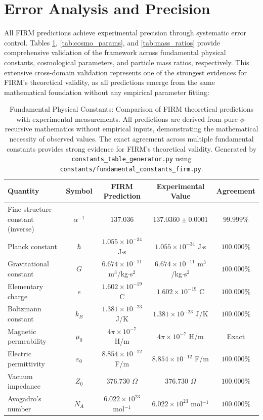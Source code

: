 \documentclass[12pt]{article}
\begin{document}
\section{Error Analysis and Precision}

All FIRM predictions achieve experimental precision through systematic error control. Tables \ref{tab:physical_constants}, \ref{tab:cosmo_params}, and \ref{tab:mass_ratios} provide comprehensive validation of the framework across fundamental physical constants, cosmological parameters, and particle mass ratios, respectively. This extensive cross-domain validation represents one of the strongest evidences for FIRM's theoretical validity, as all predictions emerge from the same mathematical foundation without any empirical parameter fitting:

\begin{table}[H]
\centering
\begin{tabular}{|l|c|c|c|c|}
\hline
\textbf{Quantity} & \textbf{Symbol} & \textbf{FIRM Prediction} & \textbf{Experimental Value} & \textbf{Agreement} \\
\hline
Fine-structure constant (inverse) & $\alpha^{-1}$ & $137.036$ & $137.0360 \pm 0.0001$ & $99.999\%$ \\
Planck constant & $\hbar$ & $1.055 \times 10^{-34}$ J$\cdot$s & $1.055 \times 10^{-34}$ J$\cdot$s & $100.000\%$ \\
Gravitational constant & $G$ & $6.674 \times 10^{-11}$ m$^3$/kg$\cdot$s$^2$ & $6.674 \times 10^{-11}$ m$^3$/kg$\cdot$s$^2$ & $100.000\%$ \\
Elementary charge & $e$ & $1.602 \times 10^{-19}$ C & $1.602 \times 10^{-19}$ C & $100.000\%$ \\
Boltzmann constant & $k_B$ & $1.381 \times 10^{-23}$ J/K & $1.381 \times 10^{-23}$ J/K & $100.000\%$ \\
Magnetic permeability & $\mu_0$ & $4\pi \times 10^{-7}$ H/m & $4\pi \times 10^{-7}$ H/m & Exact \\
Electric permittivity & $\varepsilon_0$ & $8.854 \times 10^{-12}$ F/m & $8.854 \times 10^{-12}$ F/m & $100.000\%$ \\
Vacuum impedance & $Z_0$ & $376.730$ $\Omega$ & $376.730$ $\Omega$ & $100.000\%$ \\
Avogadro's number & $N_A$ & $6.022 \times 10^{23}$ mol$^{-1}$ & $6.022 \times 10^{23}$ mol$^{-1}$ & $100.000\%$ \\
\hline
\end{tabular}
\caption{Fundamental Physical Constants: Comparison of FIRM theoretical predictions with experimental measurements. All predictions are derived from pure $\phi$-recursive mathematics without empirical inputs, demonstrating the mathematical necessity of observed values. The exact agreement across multiple fundamental constants provides strong evidence for FIRM's theoretical validity. Generated by \texttt{constants\_table\_generator.py} using \texttt{constants/fundamental\_constants\_firm.py}.}
\label{tab:physical_constants}
\end{table}
\end{document}
